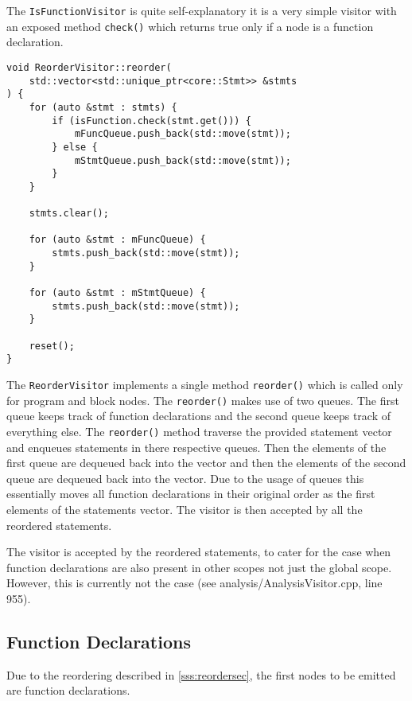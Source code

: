 The \texttt{IsFunctionVisitor} is quite self-explanatory it is a
very simple visitor with an exposed method \texttt{check()}
which returns true only if a node is a function declaration.

\begin{lstlisting}[caption={The \texttt{reorder()} method in the
\texttt{ReorderVisitor} class (preprocess/ReorderVisitor.cpp)}]
void ReorderVisitor::reorder(
    std::vector<std::unique_ptr<core::Stmt>> &stmts
) {
    for (auto &stmt : stmts) {
        if (isFunction.check(stmt.get())) {
            mFuncQueue.push_back(std::move(stmt));
        } else {
            mStmtQueue.push_back(std::move(stmt));
        }
    }

    stmts.clear();

    for (auto &stmt : mFuncQueue) {
        stmts.push_back(std::move(stmt));
    }

    for (auto &stmt : mStmtQueue) {
        stmts.push_back(std::move(stmt));
    }

    reset();
}
\end{lstlisting}

The \texttt{ReorderVisitor} implements a single method
\texttt{reorder()} which is called only for program and block
nodes. The \texttt{reorder()} makes use of two queues. The first
queue keeps track of function declarations and the second queue
keeps track of everything else. The \texttt{reorder()} method
traverse the provided statement vector and enqueues statements
in there respective queues. Then the elements of the first queue
are dequeued back into the vector and then the elements of the
second queue are dequeued back into the vector. Due to the usage
of queues this essentially moves all function declarations in
their original order as the first elements of the statements
vector. The visitor is then accepted by all the reordered
statements.

\begin{note}
The visitor is accepted by the reordered statements, to cater
for the case when function declarations are also present in
other scopes not just the global scope. However, this is
currently not the case (see analysis/AnalysisVisitor.cpp, line
955).
\end{note}

\subsection{Function Declarations}

Due to the reordering described in \ref{sss:reordersec}, the
first nodes to be emitted are function declarations.

